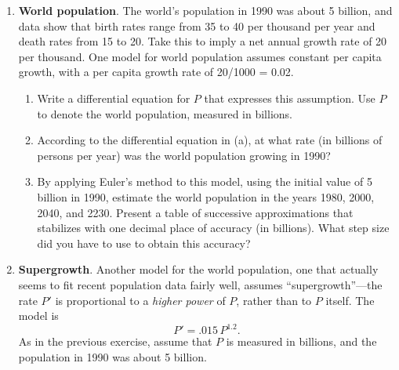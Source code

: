\begin{enumerate}
  \begin{enumerate}
  \item For the eastern cottontail rabbit, most young are born during the
months of March--May, with reduced reproduction during June--August,
and virtually no reproduction during the other six months of the year.
Write a program to generate the solution to the differential equation
$R'=k(1-R/25000)$, where $k=.2$ during March, April, and May; $k=.05$
during June, July, and August; and $k=0$ the rest of the year.  Start
with an initial population of 2000 rabbits on January 1.  You may find
that using the {\tt IF ... THEN} construction in your program is a
convenient way to incorporate the varying reproductive rate.

  \item How
would you modify the model to take into account the fact that rabbits
don't reproduce during their first season?


\end{enumerate}
\item {\bf World population}. The world's
population in 1990 was about 5 billion, and data show that birth rates
range from 35 to 40 per thousand per year and death rates from 15 to
20.  Take this to imply a net annual growth rate of 20 per thousand.
One model for world population assumes constant per capita growth,
with a per capita growth rate of 20/1000 = 0.02.

  \begin{enumerate}
  \item Write a differential equation for $P$ that expresses this assumption.  Use $P$ to denote the world population, measured in billions.

  \item According to the differential equation in (a), at what rate (in billions of persons per year) was the world population growing in 1990?

  \item By applying Euler's method to this model, using the initial value of 5 billion in 1990, estimate the world population in the years 1980, 2000, 2040, and 2230.  Present a table of successive approximations that stabilizes with one decimal place of accuracy (in billions).  What step size did you have to use to obtain this accuracy?


\end{enumerate}
\item {\bf Supergrowth}.  Another model for the world population, one that actually seems to fit recent population data fairly well, assumes ``supergrowth''---the rate $P'$ is proportional to a {\em higher power} of $P$, rather than to $P$ itself.  The model is
	\[
P'=.015 \, P^{1.2}.
\]
As in the previous exercise, assume that $P$ is measured in billions, and the population in 1990 was about 5 billion.


\end{enumerate}
